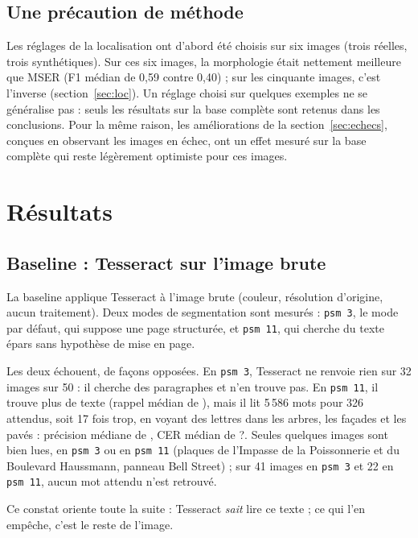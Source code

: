 \documentclass[11pt,a4paper]{article}
\newcommand{\baseCERmed}{?}\newcommand{\finFmed}{?}\newcommand{\finFmoy}{?}%
\begin{document}
\subsection{Une précaution de méthode}
Les réglages de la localisation ont d'abord été choisis sur six images (trois réelles, trois synthétiques). Sur ces six images, la morphologie était nettement meilleure que MSER (F1 médian de 0,59 contre 0,40) ; sur les cinquante images, c'est l'inverse (section~\ref{sec:loc}). Un réglage choisi sur quelques exemples ne se généralise pas : seuls les résultats sur la base complète sont retenus dans les conclusions. Pour la même raison, les améliorations de la section~\ref{sec:echecs}, conçues en observant les images en échec, ont un effet mesuré sur la base complète qui reste légèrement optimiste pour ces images.

\section{Résultats}\label{sec:resultats}

\subsection{Baseline : Tesseract sur l'image brute}
La baseline applique Tesseract à l'image brute (couleur, résolution d'origine, aucun traitement). Deux modes de segmentation sont mesurés : \texttt{psm~3}, le mode par défaut, qui suppose une page structurée, et \texttt{psm~11}, qui cherche du texte épars sans hypothèse de mise en page.

Les deux échouent, de façons opposées. En \texttt{psm~3}, Tesseract ne renvoie rien sur 32 images sur 50 : il cherche des paragraphes et n'en trouve pas. En \texttt{psm~11}, il trouve plus de texte (rappel médian de \baseRmed), mais il lit 5\,586 \og mots\fg{} pour 326 attendus, soit 17 fois trop, en voyant des lettres dans les arbres, les façades et les pavés : précision médiane de \basePmed, CER médian de \baseCERmed{}. Seules quelques images sont bien lues, en \texttt{psm~3} ou en \texttt{psm~11} (plaques de l'Impasse de la Poissonnerie et du Boulevard Haussmann, panneau \og Bell Street\fg) ; sur 41 images en \texttt{psm~3} et 22 en \texttt{psm~11}, aucun mot attendu n'est retrouvé.

Ce constat oriente toute la suite : Tesseract \emph{sait} lire ce texte ; ce qui l'en empêche, c'est le reste de l'image.
\end{document}
